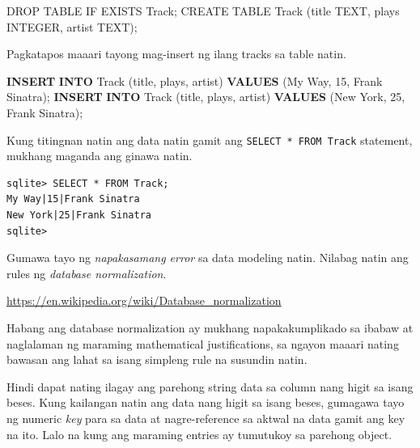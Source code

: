 \documentclass[10pt,]{book}
\newenvironment{Shaded}{}{}
\newcommand{\DecValTok}[1]{\textcolor[rgb]{0.25,0.63,0.44}{#1}}
\newcommand{\KeywordTok}[1]{\textcolor[rgb]{0.00,0.44,0.13}{\textbf{#1}}}
\newcommand{\NormalTok}[1]{#1}
\newcommand{\OperatorTok}[1]{\textcolor[rgb]{0.40,0.40,0.40}{#1}}
\newcommand{\StringTok}[1]{\textcolor[rgb]{0.25,0.44,0.63}{#1}}
\begin{document}
\begin{Shaded}
\begin{Highlighting}[]
\NormalTok{DROP TABLE IF EXISTS Track}\OperatorTok{;}
\NormalTok{CREATE TABLE Track (title TEXT, plays INTEGER, artist TEXT)}\OperatorTok{;}
\end{Highlighting}
\end{Shaded}

Pagkatapos maaari tayong mag-insert ng ilang tracks sa table natin.

\begin{Shaded}
\begin{Highlighting}[]
\KeywordTok{INSERT} \KeywordTok{INTO}\NormalTok{ Track (title, plays, artist)}
    \KeywordTok{VALUES}\NormalTok{ (}\StringTok{\textquotesingle{}My Way\textquotesingle{}}\NormalTok{, }\DecValTok{15}\NormalTok{, }\StringTok{\textquotesingle{}Frank Sinatra\textquotesingle{}}\NormalTok{);}
\KeywordTok{INSERT} \KeywordTok{INTO}\NormalTok{ Track (title, plays, artist)}
    \KeywordTok{VALUES}\NormalTok{ (}\StringTok{\textquotesingle{}New York\textquotesingle{}}\NormalTok{, }\DecValTok{25}\NormalTok{, }\StringTok{\textquotesingle{}Frank Sinatra\textquotesingle{}}\NormalTok{);}
\end{Highlighting}
\end{Shaded}

Kung titingnan natin ang data natin gamit ang
\texttt{SELECT\ *\ FROM\ Track} statement, mukhang maganda ang ginawa
natin.

{\small
\begin{verbatim}
sqlite> SELECT * FROM Track;
My Way|15|Frank Sinatra
New York|25|Frank Sinatra
sqlite>
\end{verbatim}
}

Gumawa tayo ng \emph{napakasamang error} sa data modeling natin. Nilabag
natin ang rules ng \emph{database normalization}.

\url{https://en.wikipedia.org/wiki/Database_normalization}

  Habang ang
database normalization ay mukhang napakakumplikado sa ibabaw at
naglalaman ng maraming mathematical justifications, sa ngayon maaari
nating bawasan ang lahat sa isang simpleng rule na susundin natin.

 Hindi dapat nating ilagay ang parehong string
data sa column nang higit sa isang beses. Kung kailangan natin ang data
nang higit sa isang beses, gumagawa tayo ng numeric \emph{key} para sa
data at nagre-reference sa aktwal na data gamit ang key na ito. Lalo na
kung ang maraming entries ay tumutukoy sa parehong object.
\end{document}
